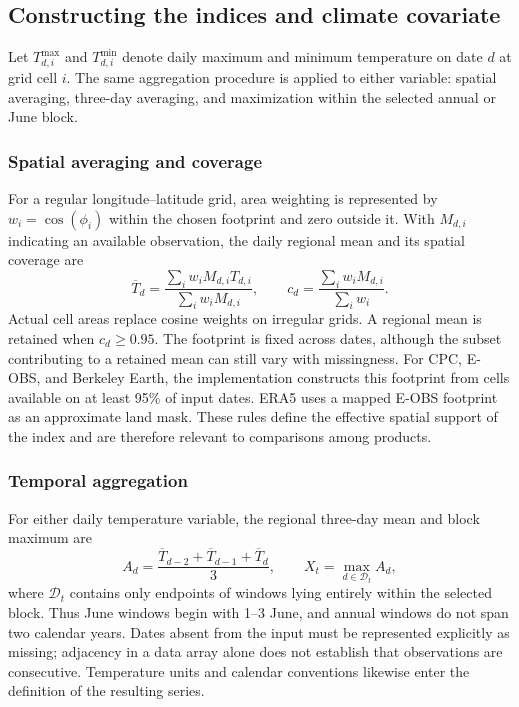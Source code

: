 \documentclass[11pt]{article}
\begin{document}
\subsection{Constructing the indices and climate covariate}
\label{sec:data}
Let $T^{\max}_{d,i}$ and $T^{\min}_{d,i}$ denote daily maximum and
minimum
temperature on date $d$ at grid cell $i$. The same aggregation
procedure
is applied to either variable: spatial averaging, three-day averaging,
and maximization within the selected annual or June block.

\subsubsection{Spatial averaging and coverage}
For a regular longitude--latitude grid, area weighting is represented
by $w_i=\cos(\phi_i)$ within the chosen footprint and zero outside it.
With $M_{d,i}$ indicating an available observation, the daily regional
mean and its spatial coverage are
\begin{equation}
\overline T_d=
\frac{\sum_i w_iM_{d,i}T_{d,i}}{\sum_i w_iM_{d,i}},\qquad
c_d=\frac{\sum_i w_iM_{d,i}}{\sum_i w_i}.
\label{eq:spatial}
\end{equation}
Actual cell areas replace cosine weights on irregular grids. A regional
mean is retained when $c_d\geq0.95$. The footprint is fixed across dates,
although the subset contributing to a retained mean can still vary with
missingness. For CPC, E-OBS, and Berkeley Earth, the implementation
constructs this footprint from cells available on at least 95\% of input
dates. ERA5 uses a mapped E-OBS footprint as an approximate land mask.
These rules define the effective spatial support of the index and are
therefore relevant to comparisons among products.

\subsubsection{Temporal aggregation}
For either daily temperature variable, the regional three-day mean and
block maximum are
\begin{equation}
A_d=\frac{\overline T_{d-2}+\overline T_{d-1}+\overline T_d}{3},
\qquad X_t=\max_{d\in\mathcal D_t}A_d,
\label{eq:index}
\end{equation}
where $\mathcal D_t$ contains only endpoints of windows lying entirely
within the selected block. Thus June windows begin with 1--3 June,
and annual windows do not span two calendar years. Dates absent from
the input must be represented explicitly as missing; adjacency in a
data array alone does not establish that observations are consecutive.
Temperature units and calendar conventions likewise enter the definition
of the resulting series.
\end{document}
